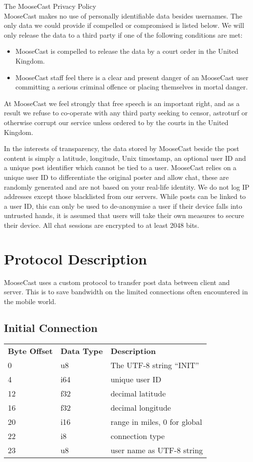 \documentclass[12pt, a4paper]{article}
\begin{document}
The MooseCast Privacy Policy\\

MooseCast makes no use of personally identifiable data besides usernames. The only data we could provide if compelled or compromised is listed below. We will only release the data to a third party if one of the following conditions are met:
\begin{itemize}
\item MooseCast is compelled to release the data by a court order in the United Kingdom.
\item MooseCast staff feel there is a clear and present danger of an MooseCast user committing a serious criminal offence or placing themselves in mortal danger.
\end{itemize}

At MooseCast we feel strongly that free speech is an important right, and as a result we refuse to co-operate with any third party seeking to censor, astroturf or otherwise corrupt our service unless ordered to by the courts in the United Kingdom.

In the interests of transparency, the data stored by MooseCast beside the post content is simply a latitude, longitude, Unix timestamp, an optional user ID and a unique post identifier which cannot be tied to a user. MooseCast relies on a unique user ID to differentiate the original poster and allow chat, these are randomly generated and are not based on your real-life identity. We do not log IP addresses except those blacklisted from our servers. While posts can be linked to a user ID, this can only be used to de-anonymise a user if their device falls into untrusted hands, it is assumed that users will take their own measures to secure their device. All chat sessions are encrypted to at least 2048 bits.


\clearpage
\section{Protocol Description}
MooseCast uses a custom protocol to transfer post data between client and server. This is to save bandwidth on the limited connections often encountered in the mobile world.
\subsection{Initial Connection}
\begin{table}[h]
\centering
\begin{tabular}{lll}
\textbf{Byte Offset} & \textbf{Data Type} &\textbf{Description}\\
0 & u8 & The UTF-8 string ``INIT''\\
4 & i64 & unique user ID\\
12 & f32 & decimal latitude\\
16 & f32 & decimal longitude\\
20 & i16 & range in miles, 0 for global\\
22 & i8 & connection type\\
23 & u8 & user name as UTF-8 string\\
\end{tabular}
\end{table}
\end{document}
